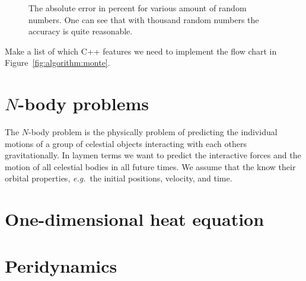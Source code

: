 \documentclass[11pt,fleqn]{book} %
\begin{document}
\begin{figure}[tb]
\centering
{}
\caption{The absolute error in percent for various amount of random numbers. One can see that with thousand random numbers the accuracy is quite reasonable. }
\label{fig:monte:carlo}
\end{figure}

\begin{exercise}
Make a list of which C++ features we need to implement the flow chart in Figure~\ref{fig:algorithm:monte}.
\end{exercise}


\chapter{$N$-body problems}
\label{sec:nbody}
The $N$-body problem is the physically problem of predicting the individual motions of a group of celestial objects interacting with each others gravitationally. In laymen terms we want to predict the interactive forces and the motion of all celestial bodies in all future times. We assume that the know their orbital properties, \emph{e.g.}\ the initial positions, velocity, and time.


\chapter{One-dimensional heat equation}

\chapter{Peridynamics}
\label{sec:pd}
\end{document}

